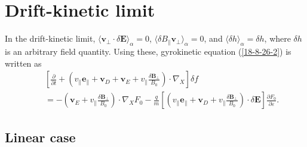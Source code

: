 \documentclass{article}
\begin{document}
\

\

\section{Drift-kinetic limit}

In the drift-kinetic limit, $\langle \mathbf{v}_{\perp} \cdot \delta
\mathbf{E} \rangle_{\alpha} = 0$, $\langle \delta B_{\parallel}
\mathbf{v}_{\perp} \rangle_{\alpha} = 0$, and $\langle \delta h
\rangle_{\alpha} = \delta h$, where $\delta h$ is an arbitrary field quantity.
Using these, gyrokinetic equation (\ref{18-8-26-2}) is written as
\begin{eqnarray}
  &  & \left[ \frac{\partial}{\partial t} + \left( v_{\parallel}
  \mathbf{e}_{\parallel} +\mathbf{v}_D +\mathbf{v}_E + v_{\parallel}
  \frac{\delta \mathbf{B}_{\perp}}{B_0} \right) \cdot \nabla_X \right] \delta
  f \nonumber\\
  &  & = - \left( \mathbf{v}_E + v_{\parallel} \frac{\delta
  \mathbf{B}_{\perp}}{B_0} \right) \cdot \nabla_X F_0 - \frac{q}{m} \left[
  \left( v_{\parallel} \mathbf{e}_{\parallel} +\mathbf{v}_D + v_{\parallel}
  \frac{\delta \mathbf{B}_{\perp}}{B_0} \right) \cdot \delta \mathbf{E}
  \right] \frac{\partial F_0}{\partial \varepsilon} .  \label{17-5-14-e1}
\end{eqnarray}

\subsection{Linear case}
\end{document}
